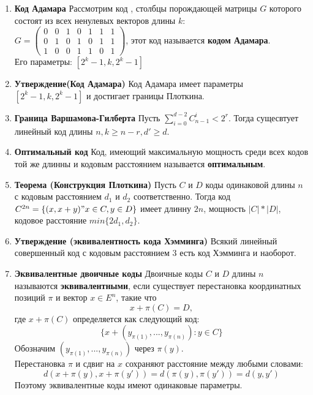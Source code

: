 \documentclass[a4paper, 12pt]{report}
\begin{document}
\begin{enumerate}
\item \textbf{Код Адамара}
Рассмотрим код , столбцы порождающей матрицы $G$ которого состоят из всех ненулевых векторов длины $k$:\\

$G = \begin{pmatrix}
0 & 0 & 1 & 0 & 1 & 1 & 1\\
0 & 1 & 0 & 1 & 0 & 1 & 1\\
1 & 0 & 0 & 1 & 1 & 0 & 1
\end{pmatrix}$, этот код называется \textbf{кодом Адамара}.\\

Его параметры: $[2^{k}-1, k, 2^{k}-1]$

\item \textbf{Утверждение(Код Адамара)}
Код Адамара имеет параметры $[2^{k}-1, k, 2^{k}-1]$ и достигает
границы Плоткина.

\item \textbf{Граница Варшамова-Гилберта}
Пусть $\sum_{i=0}^{d-2} C^{i}_{n-1} < 2^{r}$. Тогда сущесвтует линейный код длины $n, k\geq n-r, d' \geq d$.

\item \textbf{Оптимальный код} Код, имеющий максимальную мощность среди всех кодов той же длинны и кодовым расстоянием называется \textbf{оптимальным}.

\item \textbf{Теорема (Конструкция Плоткина)}
Пусть $C$ и $D$ коды одинаковой длины $n$ с кодовым расстоянием $d_{1}$ и $d_{2}$ соответственно. Тогда код $C^{2n} = \lbrace(x, x+y)" x\in C, y\in D\rbrace$ имеет длинну $2n$, мощность $|C|*|D|$, кодовое расстояние $min\lbrace 2d_{1}, d_{2}\rbrace$.

\item \textbf{Утверждение (эквивалентность кода Хэмминга)} Всякий линейный совершенный код с кодовым расстоянием $3$ есть код Хэмминга и наоборот.

\item \textbf{Эквивалентные двоичные коды} Двоичные коды $C$ и $D$ длины $n$ называются \textbf{эквивалентными}, если существует перестановка координатных позиций $\pi$ и вектор $x \in E^{n}$, такие что
\[x + \pi(C) = D,\]
где $x + \pi(C)$ определяется как следующий код:
\[\lbrace x + (y_{\pi(1)}, ... , y_{\pi(n)}) : y\in C\rbrace\]
Обозначим $(y_{\pi(1)}, ... , y_{\pi(n)})$ через $\pi(y)$.\\
Перестановка $\pi$ и сдвиг на $x$ сохраняют расстояние между любыми словами:
\[d(x + \pi(y), x + \pi(y')) = d(\pi(y), \pi(y')) = d(y,y')\]
Поэтому эквивалентные коды имеют одинаковые параметры.


\end{enumerate}
\end{document}
